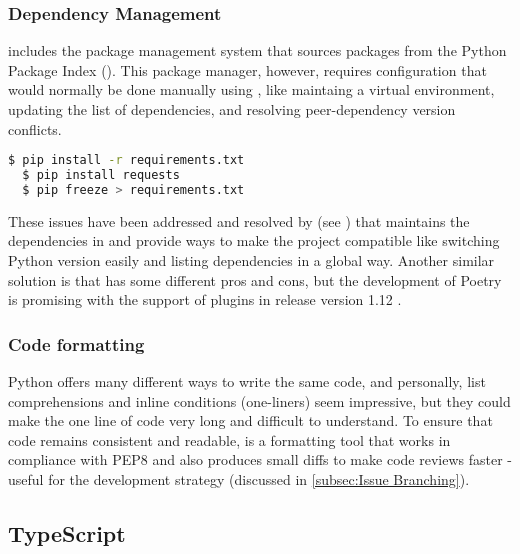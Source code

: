 \documentclass[../main.tex]{subfiles}
\begin{document}
\subsubsection[Pip]{Dependency Management}

 includes the  package management system that sources packages from the Python Package Index (). This package manager, however, requires configuration that would normally be done manually using , like maintaing a virtual environment, updating the list of dependencies, and resolving peer-dependency version conflicts.

\begin{lstlisting}[language=bash, caption={example of \code{pip} usage}]
  $ pip install -r requirements.txt
  $ pip install requests
  $ pip freeze > requirements.txt
\end{lstlisting}

These issues have been addressed and resolved by  (see ) that maintains the dependencies in  and provide ways to make the project compatible like switching Python version easily and listing dependencies in a global way. Another similar solution is  that has some different pros and cons, but the development of Poetry is promising with the support of plugins in release version 1.12 \cite{PoetryPlugin}.

\subsubsection{Code formatting}

Python offers many different ways to write the same code, and personally, list comprehensions and inline conditions (one-liners) seem impressive, but they could make the one line of code very long and difficult to understand. To ensure that code remains consistent and readable,  is a formatting tool that works in compliance with PEP8 \cite{vanrossumPEPStyleGuide2001} and also produces small diffs to make code reviews faster - useful for the development strategy (discussed in \ref{subsec:Issue Branching}).

\subsection{TypeScript}
\end{document}
